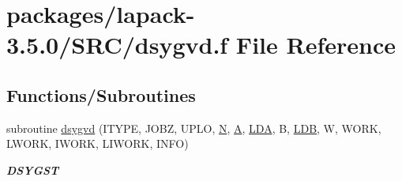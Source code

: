 \hypertarget{dsygvd_8f}{}\section{packages/lapack-\/3.5.0/\+S\+R\+C/dsygvd.f File Reference}
\label{dsygvd_8f}
\subsection*{Functions/\+Subroutines}
\begin{DoxyCompactItemize}
\item 
subroutine \hyperlink{group__doubleSYeigen_ga912ae48bb1650b2c7174807ffa5456ca}{dsygvd} (I\+T\+Y\+P\+E, J\+O\+B\+Z, U\+P\+L\+O, \hyperlink{polmisc_8c_a0240ac851181b84ac374872dc5434ee4}{N}, \hyperlink{classA}{A}, \hyperlink{example__user_8c_ae946da542ce0db94dced19b2ecefd1aa}{L\+D\+A}, B, \hyperlink{example__user_8c_a50e90a7104df172b5a89a06c47fcca04}{L\+D\+B}, W, W\+O\+R\+K, L\+W\+O\+R\+K, I\+W\+O\+R\+K, L\+I\+W\+O\+R\+K, I\+N\+F\+O)
\begin{DoxyCompactList}\small\item\em {\bfseries D\+S\+Y\+G\+S\+T} \end{DoxyCompactList}\end{DoxyCompactItemize}
